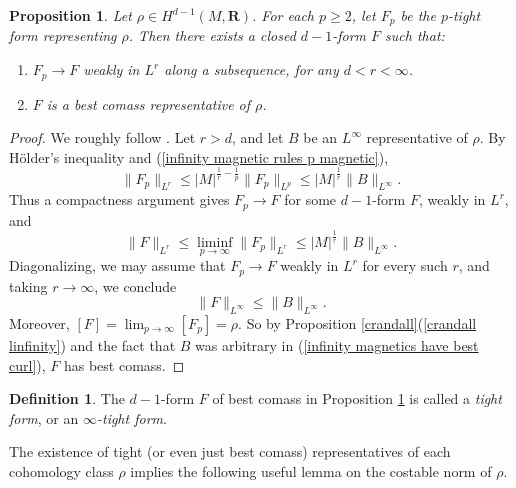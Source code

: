 \documentclass[reqno,11pt]{amsart}
\newcommand{\RR}{\mathbf{R}}
\newcommand{\dfn}[1]{\emph{#1}\index{#1}}
\newtheorem{proposition}[theorem]{Proposition}
\theoremstyle{definition}
\newtheorem{definition}[theorem]{Definition}
\numberwithin{equation}{section}
\begin{document}
\begin{proposition}\label{existence infinity}
Let $\rho \in H^{d - 1}(M, \RR)$.
For each $p \geq 2$, let $F_p$ be the $p$-tight form representing $\rho$. Then there exists a closed $d - 1$-form $F$ such that:
\begin{enumerate}
\item $F_p \to F$ weakly in $L^r$ along a subsequence, for any $d < r < \infty$.
\item $F$ is a best comass representative of $\rho$.
\end{enumerate}
\end{proposition}
\begin{proof}
We roughly follow \cite[\S3]{Lindqvist14}.
Let $r > d$, and let $B$ be an $L^\infty$ representative of $\rho$.
By H\"older's inequality and (\ref{infinity magnetic rules p magnetic}),
\begin{equation}\label{uniform bounds in p by best curl}
	\|F_p\|_{L^r} \leq |M|^{\frac{1}{r} - \frac{1}{p}} \|F_p\|_{L^p} \leq |M|^{\frac{1}{r}} \|B\|_{L^\infty}.
\end{equation}
Thus a compactness argument gives $F_p \to F$ for some $d - 1$-form $F$, weakly in $L^r$, and 
$$\|F\|_{L^r} \leq \liminf_{p \to \infty} \|F_p\|_{L^r} \leq |M|^{\frac{1}{r}} \|B\|_{L^\infty}.$$
Diagonalizing, we may assume that $F_p \to F$ weakly in $L^r$ for every such $r$, and taking $r \to \infty$, we conclude 
\begin{equation}\label{infinity magnetics have best curl}
	\|F\|_{L^\infty} \leq \|B\|_{L^\infty}.
\end{equation}
Moreover, $[F] = \lim_{p \to \infty} [F_p] = \rho$.
So by Proposition \ref{crandall}(\ref{crandall linfinity}) and the fact that $B$ was arbitrary in (\ref{infinity magnetics have best curl}), $F$ has best comass.
\end{proof}

\begin{definition}
The $d - 1$-form $F$ of best comass in Proposition \ref{existence infinity} is called a \dfn{tight form}, or an \dfn{$\infty$-tight form}.
\end{definition}

The existence of tight (or even just best comass) representatives of each cohomology class $\rho$ implies the following useful lemma on the costable norm of $\rho$.
\end{document}
